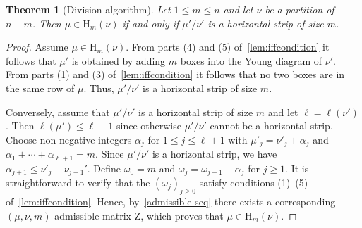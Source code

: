 \documentclass[12pt,a4paper,reqno]{amsart}
\theoremstyle{plain}
\newtheorem{theorem}{Theorem}[section]
\theoremstyle{definition}
\newcommand{\1}{\mathds{1}}
\newcommand{\HH}{\mathrm{H}}
\newcommand{\Z}{\mathrm{Z}}
\begin{document}
\begin{theorem}[Division algorithm]\label{Div-alg} Let $1\leq m\leq n$ and let  $\nu$ be a partition of $n-m$. Then $\mu\in \HH_{m}(\nu)$ if and only if $\mu'/\nu'$ is a horizontal strip of size $m$.
\end{theorem}

\begin{proof}
Assume $\mu\in \HH_m(\nu)$. From parts (4) and (5) of~\cref{lem:iffcondition} it follows that  $\mu'$ is obtained by adding $m$ boxes into the Young diagram of $\nu'$. From parts (1) and (3)  of~\cref{lem:iffcondition} it follows that no two boxes are in the same row of $\mu$. Thus,  $\mu'/\nu'$ is a horizontal strip of size $m$. 
\smallskip

Conversely, assume that $\mu'/\nu'$ is a horizontal strip of size $m$ and let $\ell=\ell(\nu')$. Then $\ell(\mu')\leq \ell+1$ since otherwise $\mu'/\nu'$ cannot be a horizontal strip. Choose non-negative integers $\alpha_j$ for $1\leq j\leq \ell+1$ with $\mu'_j=\nu'_j+\alpha_j$ and $\alpha_1+\cdots+\alpha_{\ell+1}=m$. Since $\mu'/\nu'$ is a horizontal strip, we have $\alpha_{j+1}\leq \nu'_{j}-\nu_{j+1}'$. Define $\omega_0=m$ and $\omega_j=\omega_{j-1}-\alpha_j$ for $j\geq 1$. It is straightforward to  verify that the $(\omega_j)_{j\geq 0}$ satisfy conditions (1)–(5) of~\cref{lem:iffcondition}. Hence, by~\cref{admissible-seq} there exists a corresponding $(\mu,\nu,m)$-admissible matrix $\Z$,  which proves that $\mu\in \HH_m(\nu)$.
\end{proof}
\end{document}
